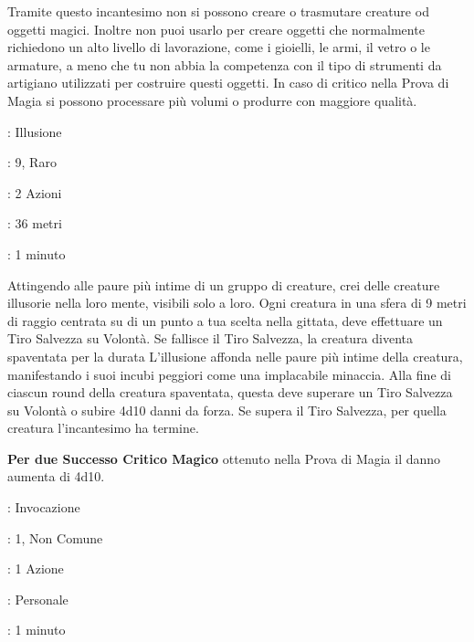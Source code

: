 \begin{multicols}{2}
Tramite questo incantesimo non si possono creare o trasmutare creature od oggetti magici. Inoltre non puoi usarlo per creare oggetti che normalmente richiedono un alto livello di lavorazione, come i gioielli, le armi, il vetro o le armature, a meno che tu non abbia la competenza con il tipo di strumenti da artigiano utilizzati per costruire questi oggetti. In caso di critico nella Prova di Magia si possono processare più volumi o produrre con maggiore qualità.

\noindent\colorbox{OBSSgold!10}{
\begin{minipage}{0.95\linewidth}
\begin{description}[noitemsep, topsep=0pt, parsep=0pt, partopsep=0pt, leftmargin=0cm, labelwidth=1.3cm]
	\item[\textbf{Lista}]: Illusione
	\item[\textbf{Livello}]: 9, Raro
	\item[\textbf{Lancio}]: 2 Azioni
	\item[\textbf{Gittata}]: 36 metri
	\item[\textbf{Durata}]: 1 minuto
\end{description}
\end{minipage}}\smallskip

Attingendo alle paure più intime di un gruppo di creature, crei delle creature illusorie nella loro mente, visibili solo a loro. Ogni creatura in una sfera di 9 metri di raggio centrata su di un punto a tua scelta nella gittata, deve effettuare un Tiro Salvezza su Volontà. Se fallisce il Tiro Salvezza, la creatura diventa spaventata per la durata L'illusione affonda nelle paure più intime della creatura, manifestando i suoi incubi peggiori come una implacabile minaccia. Alla fine di ciascun round della creatura spaventata, questa deve superare un Tiro Salvezza su Volontà o subire 4d10 danni da forza. Se supera il Tiro Salvezza, per quella creatura l'incantesimo ha termine.

\textbf{Per due Successo Critico Magico} ottenuto nella Prova di Magia il danno aumenta di 4d10.

\noindent\colorbox{OBSSgold!10}{
\begin{minipage}{0.95\linewidth}
\begin{description}[noitemsep, topsep=0pt, parsep=0pt, partopsep=0pt, leftmargin=0cm, labelwidth=1.3cm]
	\item[\textbf{Lista}]: Invocazione
	\item[\textbf{Livello}]: 1, Non Comune
	\item[\textbf{Lancio}]: 1 Azione
	\item[\textbf{Gittata}]: Personale
	\item[\textbf{Durata}]: 1 minuto
\end{description}
\end{minipage}}\smallskip


\end{multicols}
